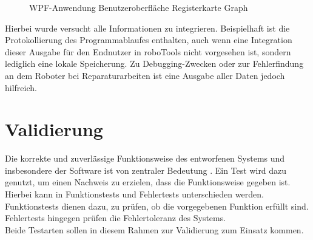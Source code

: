 \documentclass[ a4paper,
                oneside,
                toc=bibliography,
                toc=listof
                ]{scrbook}
\begin{document}
   	\begin{figure}
   		\caption{WPF-Anwendung Benutzeroberfläche Registerkarte Graph}
   		\label{fig:WPF_GUI_Graph}
   	\end{figure}
   	
   	Hierbei wurde versucht alle Informationen zu integrieren. Beispielhaft ist die Protokollierung des Programmablaufes enthalten, auch wenn eine Integration dieser Ausgabe für den Endnutzer in roboTools nicht vorgesehen ist, sondern lediglich eine lokale Speicherung. Zu Debugging-Zwecken oder zur Fehlerfindung an dem Roboter bei Reparaturarbeiten ist eine Ausgabe aller Daten jedoch hilfreich.
   	\chapter{Validierung}
   	Die korrekte und zuverlässige Funktionsweise des entworfenen Systems und insbesondere der Software ist von zentraler Bedeutung \cite{liggesmeyer2009software}.
   	Ein Test wird dazu genutzt, um einen Nachweis zu erzielen, dass die Funktionsweise gegeben ist. Hierbei kann in Funktionstests und Fehlertests unterschieden werden. Funktionstests dienen dazu, zu prüfen, ob die vorgegebenen Funktion erfüllt sind. Fehlertests hingegen prüfen die Fehlertoleranz des Systems. \cite{ISWLeitfaden} \cite{Sommerville} \\
   	Beide Testarten sollen in diesem Rahmen zur Validierung zum Einsatz kommen.\\
\end{document}
